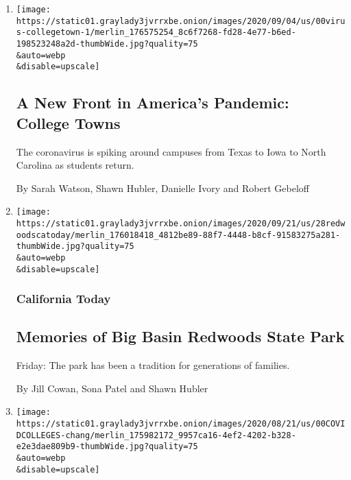 \begin{enumerate}
\def\labelenumi{\arabic{enumi}.}
\item
  \href{/2020/09/06/us/colleges-coronavirus-students.html}{}

  \texttt{[image: https://static01.graylady3jvrrxbe.onion/images/2020/09/04/us/00virus-collegetown-1/merlin\_176575254\_8c6f7268-fd28-4e77-b6ed-198523248a2d-thumbWide.jpg?quality=75\\\&auto=webp\\\&disable=upscale]}

  \hypertarget{a-new-front-in-americas-pandemic-college-towns}{%
  \subsection{A New Front in America's Pandemic: College
  Towns}\label{a-new-front-in-americas-pandemic-college-towns}}

  The coronavirus is spiking around campuses from Texas to Iowa to North
  Carolina as students return.

  By Sarah Watson, Shawn Hubler, Danielle Ivory and Robert Gebeloff
\item
  \href{/2020/08/28/us/california-fires-big-basin-redwoods.html}{}

  \texttt{[image: https://static01.graylady3jvrrxbe.onion/images/2020/09/21/us/28redwoodscatoday/merlin\_176018418\_4812be89-88f7-4448-b8cf-91583275a281-thumbWide.jpg?quality=75\\\&auto=webp\\\&disable=upscale]}

  \hypertarget{california-today}{%
  \subsubsection{California Today}\label{california-today}}

  \hypertarget{memories-of-big-basin-redwoods-state-park}{%
  \subsection{Memories of Big Basin Redwoods State
  Park}\label{memories-of-big-basin-redwoods-state-park}}

  Friday: The park has been a tradition for generations of families.

  By Jill Cowan, Sona Patel and Shawn Hubler
\item
  \href{/2020/08/22/us/college-campus-covid.html}{}

  \texttt{[image: https://static01.graylady3jvrrxbe.onion/images/2020/08/21/us/00COVIDCOLLEGES-chang/merlin\_175982172\_9957ca16-4ef2-4202-b328-e2e3dae809b9-thumbWide.jpg?quality=75\\\&auto=webp\\\&disable=upscale]}


\end{enumerate}
